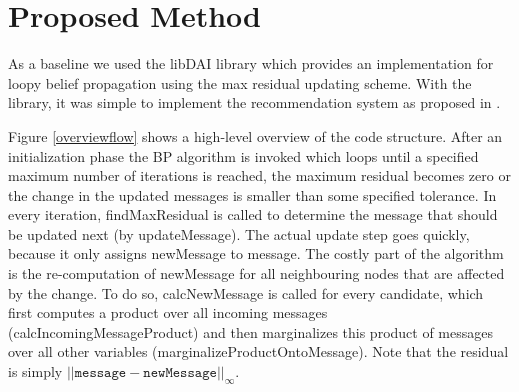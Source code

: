 \section{Proposed Method}\label{sec:method}



As a baseline we used the libDAI library \cite{Mooij_libDAI_10} which provides an implementation for loopy belief propagation using the max residual updating scheme. With the library, it was simple to implement the recommendation system as proposed in \cite{Ha:2012:TRT:2396761.2398636}.

Figure \ref{overviewflow} shows a high-level overview of the code structure. After an initialization phase the BP algorithm is invoked which loops until a specified maximum number of iterations is reached, the maximum residual becomes zero or the change in the updated messages is smaller than some specified tolerance. In every iteration, findMaxResidual is called to determine the message that should be updated next (by updateMessage). The actual update step goes quickly, because it only assigns newMessage to message. The costly part of the algorithm is the re-computation of newMessage for all neighbouring nodes that are affected by the change. To do so, calcNewMessage is called for every candidate, which first computes a product over all incoming messages (calcIncomingMessageProduct) and then marginalizes this product of messages over all other variables (marginalizeProductOntoMessage). Note that the residual is simply $||\mathtt{message}-\mathtt{newMessage}||_\infty$. 

